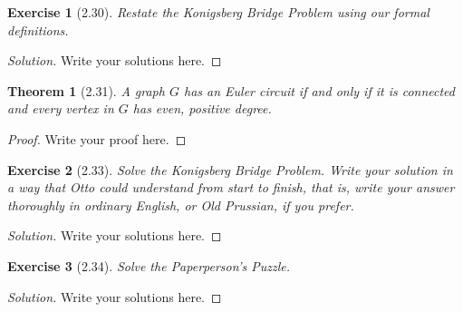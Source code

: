 \documentclass{article}
\newtheorem*{thm}{Theorem}
\newtheorem*{ex}{Exercise}
\newenvironment{solution}
  {\begin{proof}[Solution]}
  {\renewcommand{\qedsymbol}{}\end{proof}}
\begin{document}
\begin{ex}[2.30]
	Restate the Konigsberg Bridge Problem using our formal definitions.
\end{ex}
\begin{solution}
    Write your solutions here.
\end{solution}

\begin{thm}[2.31]
	A graph $G$ has an Euler circuit if and only if it is connected and every vertex in $G$ has even, positive degree.
\end{thm}
\begin{proof}
    Write your proof here.
\end{proof}

\begin{ex}[2.33]
	Solve the Konigsberg Bridge Problem. Write your solution in a way that Otto could understand from start to finish, that is, write your
	answer thoroughly in ordinary English, or Old Prussian, if you prefer.
\end{ex}
\begin{solution}
    Write your solutions here.
\end{solution}

\begin{ex}[2.34]
	Solve the Paperperson’s Puzzle.
\end{ex}
\begin{solution}
    Write your solutions here.
\end{solution}
\end{document}
